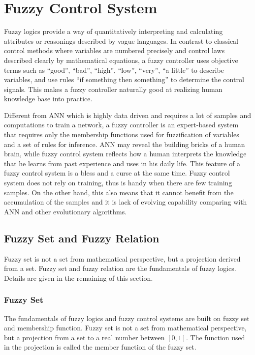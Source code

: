 \chapter{Fuzzy Control System} \label{ch:fcs}

Fuzzy logics provide a way of quantitatively interpreting and calculating attributes or reasonings described by vague languages. In contrast to classical control methods where variables are numbered precisely and control laws described clearly by mathematical equations, a fuzzy controller uses objective terms such as ``good'', ``bad'', ``high'', ``low'', ``very'', ``a little'' to describe variables, and use rules ``if something then something'' to determine the control signals. This makes a fuzzy controller naturally good at realizing human knowledge base into practice.

Different from ANN which is highly data driven and requires a lot of samples and computations to train a network, a fuzzy controller is an expert-based system that requires only the membership functions used for fuzzification of variables and a set of rules for inference. ANN may reveal the building bricks of a human brain, while fuzzy control system reflects how a human interprets the knowledge that he learns from past experience and uses in his daily life. This feature of a fuzzy control system is a bless and a curse at the same time. Fuzzy control system does not rely on training, thus is handy when there are few training samples. On the other hand, this also means that it cannot benefit from the accumulation of the samples and it is lack of evolving capability comparing with ANN and other evolutionary algorithms.

\section{Fuzzy Set and Fuzzy Relation}

Fuzzy set is not a set from mathematical perspective, but a projection derived from a set. Fuzzy set and fuzzy relation are the fundamentals of fuzzy logics. Details are given in the remaining of this section.

\subsection{Fuzzy Set}

The fundamentals of fuzzy logics and fuzzy control systems are built on fuzzy set and membership function. Fuzzy set is not a set from mathematical perspective, but a projection from a set to a real number between $[0, 1]$. The function used in the projection is called the member function of the fuzzy set.


